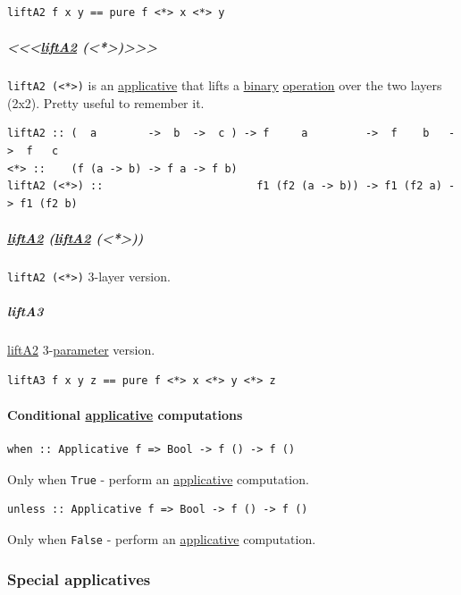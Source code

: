 \documentclass[a4paper,14pt,oneside]{book}
\begin{document}
\begin{verbatim}
liftA2 f x y == pure f <*> x <*> y
\end{verbatim}

\subparagraph{<<<\hyperref[orgacea728]{liftA2} (<*>)>>>}
\label{sec:org718e069}
\texttt{liftA2 (<*>)} is an \hyperref[orge473e43]{applicative} that lifts a \hyperref[orgf1d7c65]{binary} \hyperref[org3bbc0fe]{operation} over the two layers (2x2). Pretty useful to remember it.
\begin{verbatim}
liftA2 :: (  a        ->  b  ->  c ) -> f     a         ->  f    b   ->  f   c
<*> ::    (f (a -> b) -> f a -> f b)
liftA2 (<*>) ::                        f1 (f2 (a -> b)) -> f1 (f2 a) -> f1 (f2 b)
\end{verbatim}

\subparagraph{\hyperref[orgacea728]{liftA2} (\hyperref[orgacea728]{liftA2} (<*>))}
\label{sec:org48bed91}
\texttt{liftA2 (<*>)} 3-layer version.

\subparagraph{\label{org73724b4}liftA3}
\label{sec:orgd6325ed}
\hyperref[orgacea728]{liftA2} 3-\hyperref[org022cfa5]{parameter} version.

\begin{verbatim}
liftA3 f x y z == pure f <*> x <*> y <*> z
\end{verbatim}

\paragraph{Conditional \hyperref[orge473e43]{applicative} computations}
\label{sec:org0fec39f}
\begin{verbatim}
when :: Applicative f => Bool -> f () -> f ()
\end{verbatim}

Only when \texttt{True} - perform an \hyperref[orge473e43]{applicative} computation.

\begin{verbatim}
unless :: Applicative f => Bool -> f () -> f ()
\end{verbatim}

Only when \texttt{False} - perform an \hyperref[orge473e43]{applicative} computation.

\subsubsection{\label{org3340442}Special applicatives}
\label{sec:orgb0fe7a0}
\end{document}
